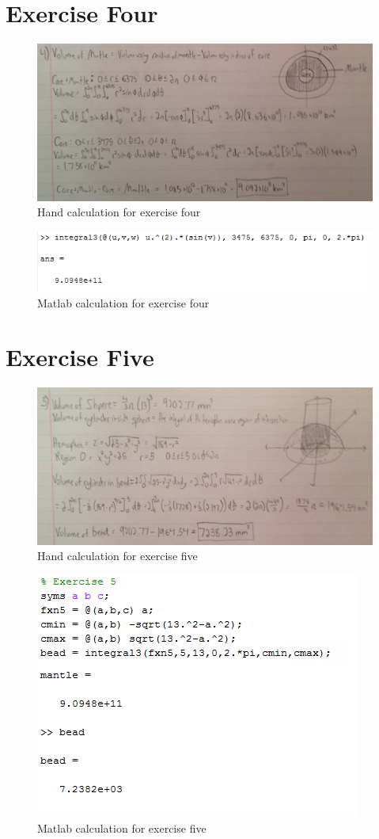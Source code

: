 \documentclass[11pt]{article}
\begin{document}
\section*{Exercise Four}
\begin{figure}[H]
	\includegraphics[width=\textwidth]{Four_Hand}
	\caption{Hand calculation for exercise four}
\end{figure}
\begin{figure}[H]
	\includegraphics[width=\textwidth]{Four_Mat.PNG}
	\caption*{Matlab calculation for exercise four}
\end{figure}

\section*{Exercise Five}
\begin{figure}[H]
	\includegraphics[width=\textwidth]{Five_Hand}
	\caption*{Hand calculation for exercise five}
\end{figure}
\begin{figure}[H]
	\includegraphics[width=\textwidth]{5}
	\caption*{Matlab calculation for exercise five}
\end{figure}
\end{document}
